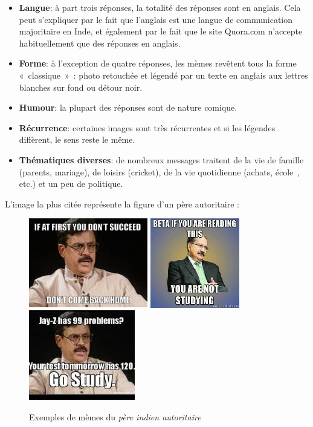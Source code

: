 \begin{itemize}
\item
\textbf{Langue}: à part trois réponses, la totalité des réponses sont en anglais. Cela peut s’expliquer par le fait que l’anglais est une langue de communication majoritaire en Inde, et également par le fait que le site Quora.com n’accepte habituellement que des réponses en anglais.
\item
\textbf{Forme}: à l’exception de quatre réponses, les mèmes revêtent tous la forme « classique » : photo retouchée et légendé par un texte en anglais aux lettres blanches sur fond ou détour noir.

\item
\textbf{Humour}: la plupart des réponses sont de nature comique.
\item
\textbf{Récurrence}: certaines images sont très récurrentes et si les légendes diffèrent, le sens reste le même.
\item
\textbf{Thématiques diverses}: de nombreux messages traitent de la vie de famille (parents, mariage), de loisirs (cricket), de la vie quotidienne (achats, école , etc.) et un peu de politique.
\end{itemize}

L{\textquoteright}image la plus cit\'ee repr\'esente la figure
d{\textquoteright}un p\`ere autoritaire :

\begin{figure}
    \includegraphics[width=2.0449in,height=1.5335in]{figures/chap2/chapitre2-img8.jpg}
    \includegraphics[width=1.5335in,height=1.5335in]{figures/chap2/chapitre2-img9.jpg}
    \includegraphics[width=1.8224in,height=1.5449in]{figures/chap2/chapitre2-img10.jpg}
    \caption{Exemples de m\`emes du \textit{p\`ere indien autoritaire}}
    \label{fig:severe-dad}

\end{figure}



